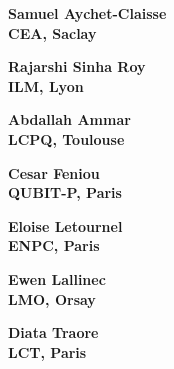 \documentclass[20pt]{beamer}
\begin{document}
\begin{frame}
	\begin{center}
		\huge \bf Samuel Aychet-Claisse
		\\
		\vspace{20mm}
		\large CEA, Saclay
	\end{center}
\end{frame}

\begin{frame}
	\begin{center}
		\huge \bf Rajarshi Sinha Roy
		\\
		\vspace{20mm}
		\large ILM, Lyon
	\end{center}
\end{frame}

\begin{frame}
	\begin{center}
		\huge \bf Abdallah Ammar
		\\
		\vspace{20mm}
		\large LCPQ, Toulouse
	\end{center}
\end{frame}

\begin{frame}
	\begin{center}
		\huge \bf Cesar Feniou
		\\
		\vspace{20mm}
		\large  QUBIT-P, Paris
	\end{center}
\end{frame}

\begin{frame}
	\begin{center}
		\huge \bf Eloise Letournel
		\\
		\vspace{20mm}
		\large  ENPC, Paris
	\end{center}
\end{frame}

\begin{frame}
	\begin{center}
		\huge \bf Ewen Lallinec
		\\
		\vspace{20mm}
		\large LMO, Orsay
	\end{center}
\end{frame}

\begin{frame}
	\begin{center}
		\huge \bf Diata Traore
		\\
		\vspace{20mm}
		\large  LCT, Paris
	\end{center}
\end{frame}
\end{document}
